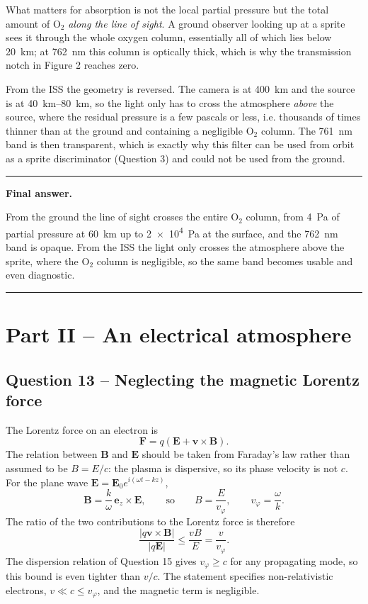 \documentclass[11pt,a4paper]{article}
\newenvironment{finalanswer}{%
  \begin{center}\begin{minipage}{0.94\linewidth}\hrule\vspace{0.45em}\textbf{Final answer. }%
}{%
  \vspace{0.45em}\hrule\end{minipage}\end{center}%
}
\newcommand{\E}{\mathbf{E}}
\newcommand{\B}{\mathbf{B}}
\newcommand{\Otwo}{\ensuremath{\mathrm{O}_2}}
\begin{document}
What matters for absorption is not the local partial pressure but the total
amount of \Otwo{} \emph{along the line of sight}. A ground observer looking up at
a sprite sees it through the whole oxygen column, essentially all of which lies
below \SI{20}{km}; at \SI{762}{nm} this column is optically thick, which is why
the transmission notch in Figure 2 reaches zero.

From the ISS the geometry is reversed. The camera is at \SI{400}{km} and the
source is at \SIrange{40}{80}{km}, so the light only has to cross the atmosphere
\emph{above} the source, where the residual pressure is a few pascals or less,
i.e. thousands of times thinner than at the ground and containing a negligible
\Otwo{} column. The \SI{761}{nm} band is then transparent, which is exactly why
this filter can be used from orbit as a sprite discriminator (Question 3) and
could not be used from the ground.

\begin{finalanswer}
From the ground the line of sight crosses the entire \Otwo{} column, from \SI{4}{Pa} of partial pressure at \SI{60}{km} up to \SI{2e4}{Pa} at the surface, and the \SI{762}{nm} band is opaque. From the ISS the light only crosses the atmosphere above the sprite, where the \Otwo{} column is negligible, so the same band becomes usable and even diagnostic.
\end{finalanswer}

\section{Part II -- An electrical atmosphere}

\subsection*{Question 13 -- Neglecting the magnetic Lorentz force}

The Lorentz force on an electron is
\[
 \mathbf{F}=q(\E+\mathbf{v}\times\B).
\]
The relation between $\B$ and $\E$ should be taken from Faraday's law rather than
assumed to be $B=E/c$: the plasma is dispersive, so its phase velocity is not
$c$. For the plane wave $\E=\E_0e^{i(\omega t-kz)}$,
\[
 \B=\frac{k}{\omega}\,\mathbf e_z\times\E,
 \qquad\text{so}\qquad
 B=\frac{E}{v_\varphi},
 \qquad v_\varphi=\frac{\omega}{k}.
\]
The ratio of the two contributions to the Lorentz force is therefore
\[
 \frac{|q\mathbf{v}\times\B|}{|q\E|}\leq\frac{vB}{E}=\frac{v}{v_\varphi}.
\]
The dispersion relation of Question 15 gives $v_\varphi\geq c$ for any
propagating mode, so this bound is even tighter than $v/c$. The statement
specifies non-relativistic electrons, $v\ll c\leq v_\varphi$, and the magnetic
term is negligible.
\end{document}
